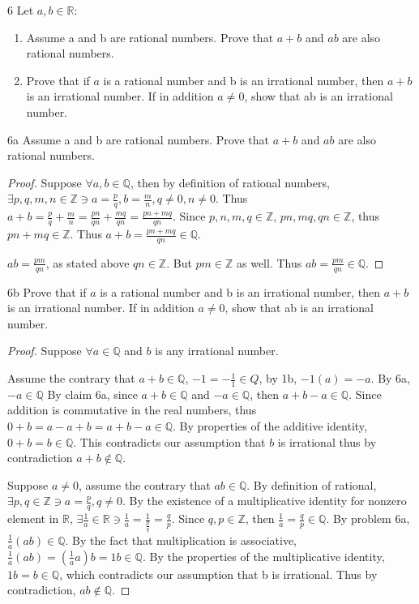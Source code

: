 \documentclass{article}
\newcommand{\R}{\mathbb{R}}
\newcommand{\Q}{\mathbb{Q}}
\newcommand{\Z}{\mathbb{Z}}
\begin{document}
\begin{PROB}{6}\label{Problem 6.}
    Let $a, b \in \R$:
    
    \begin{enumerate}
        \item Assume a and b are rational numbers. Prove that $a + b$ and $ab$ are also rational numbers.
        \item Prove that if $a$ is a rational number and b is an irrational number, then $a + b$ is an irrational number. If in addition $a \neq 0$, show that ab is an irrational number.
    \end{enumerate}
    
\end{PROB}
\begin{claim}{6a}\label{Claim 6a.}
    Assume a and b are rational numbers. Prove that $a + b$ and $ab$ are also rational numbers.
\end{claim}
\begin{proof}
    Suppose $\forall a, b \in \Q$, then by definition of rational numbers, $\exists p,q, m, n \in \Z \ni a = \frac{p}{q}, b = \frac{m}{n}, q \neq 0, n \neq 0$. Thus $a + b = \frac{p}{q} + \frac{m}{n} = \frac{pn}{qn} + \frac{mq}{qn} = \frac{pn + mq}{qn}$. Since $p, n, m, q \in \Z$, $pn, mq, qn \in \Z$, thus $pn + mq \in \Z $. Thus $a + b = \frac{pn + mq}{qn} \in \Q$. 
    
    $ab = \frac{pm}{qn}$, as stated above $qn \in \Z$. But $pm \in \Z$ as well. Thus $ab = \frac{pm}{qn} \in \Q$.  
\end{proof}
\begin{claim}{6b}\label{Claim 6b.}
    Prove that if $a$ is a rational number and b is an irrational number, then $a + b$ is an irrational number. If in addition $a \neq 0$, show that ab is an irrational number.
\end{claim}
\begin{proof}
    Suppose $\forall a \in \Q$ and $b$ is any irrational number. 
    
    Assume the contrary that $a + b \in \Q$, $-1 = -\frac{1}{1} \in Q$, by 1b, $-1(a) = -a$. By 6a, $-a \in \Q$  By claim 6a, since $a + b \in \Q$ and $-a \in \Q$, then $a + b - a \in \Q$. Since addition is commutative in the real numbers, thus $0 + b = a - a + b = a + b - a \in \Q$. By properties of the additive identity, $0 + b = b \in \Q$. This contradicts our assumption that $b$ is irrational thus by contradiction $a + b \not \in \Q$.
    
    Suppose $a \neq 0$, assume the contrary that $ab \in \Q$. By definition of rational, $\exists p, q \in \Z \ni a = \frac{p}{q}, q \neq 0$. By the existence of a multiplicative identity for nonzero element in $\R$, $\exists \frac{1}{a} \in \R \ni \frac{1}{a} = \frac{1}{\frac{p}{q}} = \frac{q}{p}$. Since $q, p \in \Z$, then $\frac{1}{a} = \frac{q}{p} \in \Q$. By problem 6a, $\frac{1}{a}(ab) \in \Q$. By the fact that multiplication is associative, $\frac{1}{a}(ab) = (\frac{1}{a}a)b = 1b \in \Q$. By the properties of the multiplicative identity, $1b = b \in \Q$, which contradicts our assumption that b is irrational. Thus by contradiction, $ab \not \in \Q$.         
\end{proof}
\end{document}

